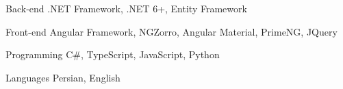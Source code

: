 

\begin{cvskills}

  \cvskill
    {Back-end} %
    {.NET Framework, .NET 6+, Entity Framework} %

  \cvskill
    {Front-end} %
    {Angular Framework, NGZorro, Angular Material, PrimeNG, JQuery} %

  \cvskill
    {Programming} %
    {C#, TypeScript, JavaScript, Python} %

  \cvskill
    {Languages} %
    {Persian, English} %

\end{cvskills}
